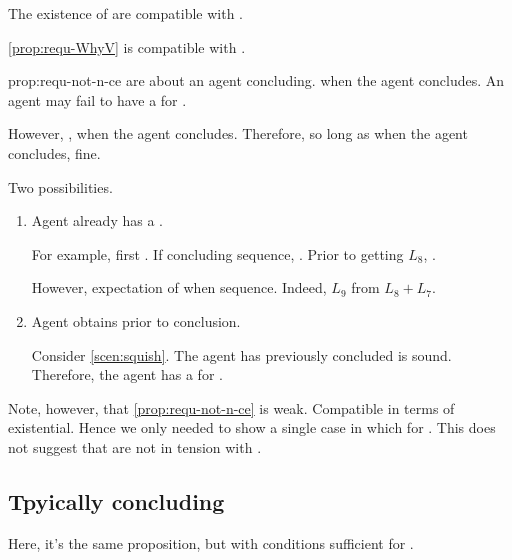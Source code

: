 \begin{note}
  The existence of  are compatible with \issueConstraint{}.

  \begin{observation}%
    \label{prop:requ-not-n-ce}%
    \autoref{prop:requ-WhyV} is compatible with \issueConstraint{}.
  \end{observation}

  \begin{motivation}{prop:requ-not-n-ce}
     are about an agent concluding.
    \fc{} when the agent concludes.
    An agent may fail to have a \wit{} for \fc{}.

    However, \issueConstraint{}, \wit{} when the agent concludes.
    Therefore, so long as \wit{} when the agent concludes, fine.

    Two possibilities.
    \begin{enumerate}
    \item
      Agent already has a \wit{}.

      For example, first .
      If concluding sequence, \fc{}.
      Prior to getting \(L_{8}\), \fc{}.

      However, expectation of \wit{} when sequence.
      Indeed, \(L_{9}\) from \(L_{8} + L_{7}\).
    \item
      Agent obtains \wit{} prior to conclusion.

      Consider \autoref{scen:squish}.
      The agent has previously concluded \sqE{} is sound.
      Therefore, the agent has a \wit{} for \ros{}.
    \end{enumerate}
  \end{motivation}

  Note, however, that \autoref{prop:requ-not-n-ce} is weak.
  Compatible in terms of existential.
  Hence we only needed to show a single case in which \wit{} for \requ{}.
  This does not suggest that  are not in tension with \issueConstraint{}.
\end{note}

\subsection{Tpyically concluding}
\label{sec:tpyically-concluding}

\begin{note}
  Here, it's the same proposition, but with conditions sufficient for \requ{}.
\end{note}



